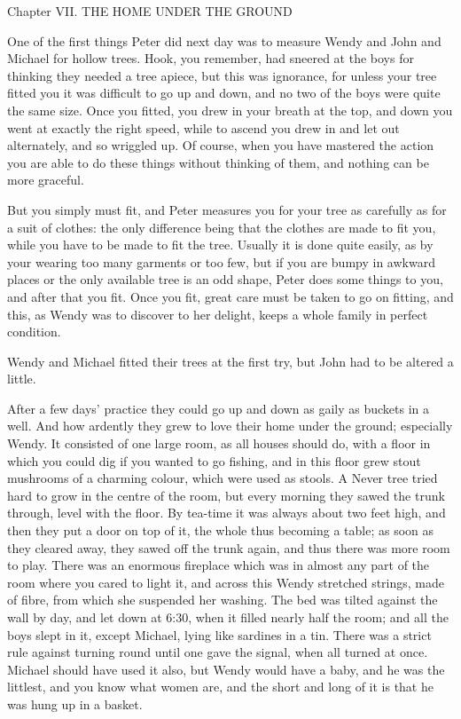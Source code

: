Chapter VII.
THE HOME UNDER THE GROUND


One of the first things Peter did next day was to measure Wendy and
John and Michael for hollow trees. Hook, you remember, had sneered at
the boys for thinking they needed a tree apiece, but this was
ignorance, for unless your tree fitted you it was difficult to go up
and down, and no two of the boys were quite the same size. Once you
fitted, you drew in your breath at the top, and down you went at
exactly the right speed, while to ascend you drew in and let out
alternately, and so wriggled up. Of course, when you have mastered the
action you are able to do these things without thinking of them, and
nothing can be more graceful.

But you simply must fit, and Peter measures you for your tree as
carefully as for a suit of clothes: the only difference being that the
clothes are made to fit you, while you have to be made to fit the tree.
Usually it is done quite easily, as by your wearing too many garments
or too few, but if you are bumpy in awkward places or the only
available tree is an odd shape, Peter does some things to you, and
after that you fit. Once you fit, great care must be taken to go on
fitting, and this, as Wendy was to discover to her delight, keeps a
whole family in perfect condition.

Wendy and Michael fitted their trees at the first try, but John had to
be altered a little.

After a few days' practice they could go up and down as gaily as
buckets in a well. And how ardently they grew to love their home under
the ground; especially Wendy. It consisted of one large room, as all
houses should do, with a floor in which you could dig if you wanted to
go fishing, and in this floor grew stout mushrooms of a charming
colour, which were used as stools. A Never tree tried hard to grow in
the centre of the room, but every morning they sawed the trunk through,
level with the floor. By tea-time it was always about two feet high,
and then they put a door on top of it, the whole thus becoming a table;
as soon as they cleared away, they sawed off the trunk again, and thus
there was more room to play. There was an enormous fireplace which was
in almost any part of the room where you cared to light it, and across
this Wendy stretched strings, made of fibre, from which she suspended
her washing. The bed was tilted against the wall by day, and let down
at 6:30, when it filled nearly half the room; and all the boys slept in
it, except Michael, lying like sardines in a tin. There was a strict
rule against turning round until one gave the signal, when all turned
at once. Michael should have used it also, but Wendy would have a baby,
and he was the littlest, and you know what women are, and the short and
long of it is that he was hung up in a basket.

